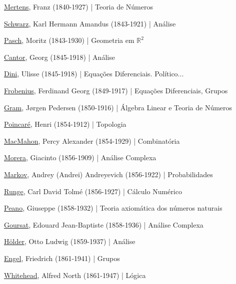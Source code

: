 \documentclass[12pt,a4paper]{article}
\begin{document}
			\href{http://en.wikipedia.org/wiki/Franz_Mertens}{Mertens}, Franz (1840-1927) | Teoria de N\'umeros

			\href{http://pt.wikipedia.org/wiki/Hermann_Amandus_Schwarz}{Schwarz}, Karl Hermann Amandus (1843-1921) | An\'alise

			\href{http://en.wikipedia.org/wiki/Moritz_Pasch}{Pasch}, Moritz (1843-1930) | Geometria em $ \mathbb{R}^2 $

			\href{http://pt.wikipedia.org/wiki/Georg_Cantor}{Cantor}, Georg (1845-1918) | An\'alise

			\href{http://pt.wikipedia.org/wiki/Ulisse_Dini}{Dini}, Ulisse (1845-1918) | Equa\c{c}\~oes Diferenciais. Pol\'itico...

			\href{http://en.wikipedia.org/wiki/Ferdinand_Georg_Frobenius}{Frobenius}, Ferdinand Georg (1849-1917) | Equa\c{c}\~oes Diferenciais, Grupos

			\href{http://en.wikipedia.org/wiki/J\%C3\%B8rgen_Pedersen_Gram}{Gram}, Jørgen Pedersen (1850-1916) | \'Algebra Linear e Teoria de N\'umeros

			\href{http://pt.wikipedia.org/wiki/Henri_Poincar\%C3\%A9}{Poincar\'e}, Henri (1854-1912) | Topologia

			\href{http://en.wikipedia.org/wiki/Percy_MacMahon}{MacMahon}, Percy Alexander (1854-1929) | Combinat\'oria

			\href{http://en.wikipedia.org/wiki/Giacinto_Morera}{Morera}, Giacinto (1856-1909) | An\'alise Complexa

			\href{http://en.wikipedia.org/wiki/Andrey_Markov}{Markov}, Andrey (Andrei) Andreyevich (1856-1922) | Probabilidades

			\href{http://en.wikipedia.org/wiki/Carl_Runge}{Runge}, Carl David Tolm\'e (1856-1927) | C\'alculo Num\'erico

			\href{http://pt.wikipedia.org/wiki/Peano}{Peano}, Giuseppe (1858-1932) | Teoria axiom\'atica dos n\'umeros naturais

			\href{http://en.wikipedia.org/wiki/Goursat}{Goursat}, Edouard Jean-Baptiste (1858-1936) | An\'alise Complexa

			\href{http://pt.wikipedia.org/wiki/Otto_H\%C3\%B6lder}{Hölder}, Otto Ludwig (1859-1937) | An\'alise

			\href{http://en.wikipedia.org/wiki/Friedrich_Engel_(mathematician)}{Engel}, Friedrich (1861-1941) | Grupos

			\href{http://en.wikipedia.org/wiki/A.N._Whitehead}{Whitehead}, Alfred North (1861-1947) | L\'ogica
\end{document}
